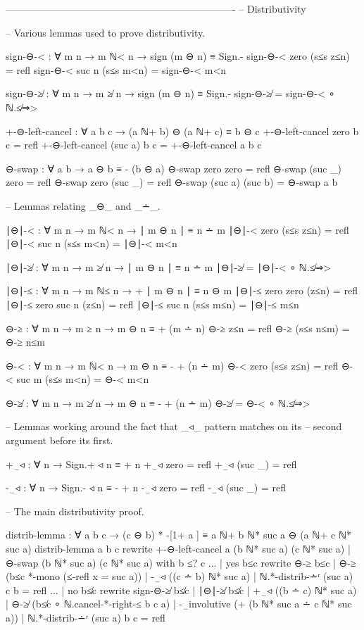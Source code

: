 \documentclass[11pt,a4paper]{article}
\begin{document}
\begin{code}
  ----------------------------------------------------------------------
  -- Distributivity

  -- Various lemmas used to prove distributivity.

  sign-⊖-< : ∀ {m n} → m ℕ< n → sign (m ⊖ n) ≡ Sign.-
  sign-⊖-< {zero}  (s≤s z≤n) = refl
  sign-⊖-< {suc n} (s≤s m<n) = sign-⊖-< m<n

  sign-⊖-≱ : ∀ {m n} → m ≱ n → sign (m ⊖ n) ≡ Sign.-
  sign-⊖-≱ = sign-⊖-< ∘ ℕ.≰⇒>

  +-⊖-left-cancel : ∀ a b c → (a ℕ+ b) ⊖ (a ℕ+ c) ≡ b ⊖ c
  +-⊖-left-cancel zero    b c = refl
  +-⊖-left-cancel (suc a) b c = +-⊖-left-cancel a b c

  ⊖-swap : ∀ a b → a ⊖ b ≡ - (b ⊖ a)
  ⊖-swap zero    zero    = refl
  ⊖-swap (suc _) zero    = refl
  ⊖-swap zero    (suc _) = refl
  ⊖-swap (suc a) (suc b) = ⊖-swap a b

  -- Lemmas relating _⊖_ and _∸_.

  ∣⊖∣-< : ∀ {m n} → m ℕ< n → ∣ m ⊖ n ∣ ≡ n ∸ m
  ∣⊖∣-< {zero}  (s≤s z≤n) = refl
  ∣⊖∣-< {suc n} (s≤s m<n) = ∣⊖∣-< m<n

  ∣⊖∣-≱ : ∀ {m n} → m ≱ n → ∣ m ⊖ n ∣ ≡ n ∸ m
  ∣⊖∣-≱ = ∣⊖∣-< ∘ ℕ.≰⇒>

  ∣⊖∣-≤ : ∀ {m n} → m ℕ≤ n → + ∣ m ⊖ n ∣ ≡ n ⊖ m
  ∣⊖∣-≤ {zero} {zero} (z≤n) = refl
  ∣⊖∣-≤ {zero} {suc n} (z≤n) = refl
  ∣⊖∣-≤ {suc n} (s≤s m≤n) = ∣⊖∣-≤ m≤n

  ⊖-≥ : ∀ {m n} → m ≥ n → m ⊖ n ≡ + (m ∸ n)
  ⊖-≥ z≤n       = refl
  ⊖-≥ (s≤s n≤m) = ⊖-≥ n≤m

  ⊖-< : ∀ {m n} → m ℕ< n → m ⊖ n ≡ - + (n ∸ m)
  ⊖-< {zero}  (s≤s z≤n) = refl
  ⊖-< {suc m} (s≤s m<n) = ⊖-< m<n

  ⊖-≱ : ∀ {m n} → m ≱ n → m ⊖ n ≡ - + (n ∸ m)
  ⊖-≱ = ⊖-< ∘ ℕ.≰⇒>

  -- Lemmas working around the fact that _◃_ pattern matches on its
  -- second argument before its first.

  +‿◃ : ∀ n → Sign.+ ◃ n ≡ + n
  +‿◃ zero    = refl
  +‿◃ (suc _) = refl

  -‿◃ : ∀ n → Sign.- ◃ n ≡ - + n
  -‿◃ zero    = refl
  -‿◃ (suc _) = refl

  -- The main distributivity proof.

  distrib-lemma :
    ∀ a b c → (c ⊖ b) * -[1+ a ] ≡ a ℕ+ b ℕ* suc a ⊖ (a ℕ+ c ℕ* suc a)
  distrib-lemma a b c
    rewrite +-⊖-left-cancel a (b ℕ* suc a) (c ℕ* suc a)
          | ⊖-swap (b ℕ* suc a) (c ℕ* suc a)
    with b ≤? c
  ... | yes b≤c
    rewrite ⊖-≥ b≤c
          | ⊖-≥ (b≤c *-mono (≤-refl {x = suc a}))
          | -‿◃ ((c ∸ b) ℕ* suc a)
          | ℕ.*-distrib-∸ʳ (suc a) c b
          = refl
  ... | no b≰c
    rewrite sign-⊖-≱ b≰c
          | ∣⊖∣-≱ b≰c
          | +‿◃ ((b ∸ c) ℕ* suc a)
          | ⊖-≱ (b≰c ∘ ℕ.cancel-*-right-≤ b c a)
          | -‿involutive (+ (b ℕ* suc a ∸ c ℕ* suc a))
          | ℕ.*-distrib-∸ʳ (suc a) b c
          = refl


\end{code}
\end{document}

